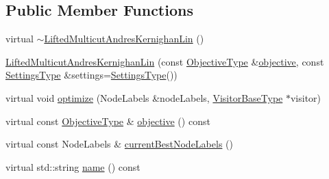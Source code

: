 \subsection*{Public Member Functions}
\begin{DoxyCompactItemize}
\item 
virtual \hyperlink{classnifty_1_1graph_1_1optimization_1_1lifted__multicut_1_1LiftedMulticutAndresKernighanLin_accb9a1a5271cc64b7e8c9e1fc1c264b6}{$\sim$\+Lifted\+Multicut\+Andres\+Kernighan\+Lin} ()
\item 
\hyperlink{classnifty_1_1graph_1_1optimization_1_1lifted__multicut_1_1LiftedMulticutAndresKernighanLin_ab5827128027f87c997e6f4ce5fecbb75}{Lifted\+Multicut\+Andres\+Kernighan\+Lin} (const \hyperlink{classnifty_1_1graph_1_1optimization_1_1lifted__multicut_1_1LiftedMulticutAndresKernighanLin_a658bf9081f6bab3e55d4707d1ca57780}{Objective\+Type} \&\hyperlink{classnifty_1_1graph_1_1optimization_1_1lifted__multicut_1_1LiftedMulticutAndresKernighanLin_a67c929ae76bdea96436c81d144aa648c}{objective}, const \hyperlink{structnifty_1_1graph_1_1optimization_1_1lifted__multicut_1_1LiftedMulticutAndresKernighanLin_1_1SettingsType}{Settings\+Type} \&settings=\hyperlink{structnifty_1_1graph_1_1optimization_1_1lifted__multicut_1_1LiftedMulticutAndresKernighanLin_1_1SettingsType}{Settings\+Type}())
\item 
virtual void \hyperlink{classnifty_1_1graph_1_1optimization_1_1lifted__multicut_1_1LiftedMulticutAndresKernighanLin_a587b8e8dcdba7aa6404f87eea1db687a}{optimize} (Node\+Labels \&node\+Labels, \hyperlink{classnifty_1_1graph_1_1optimization_1_1lifted__multicut_1_1LiftedMulticutAndresKernighanLin_a36384cde373a8f776b897b4cb83607bb}{Visitor\+Base\+Type} $\ast$visitor)
\item 
virtual const \hyperlink{classnifty_1_1graph_1_1optimization_1_1lifted__multicut_1_1LiftedMulticutAndresKernighanLin_a658bf9081f6bab3e55d4707d1ca57780}{Objective\+Type} \& \hyperlink{classnifty_1_1graph_1_1optimization_1_1lifted__multicut_1_1LiftedMulticutAndresKernighanLin_a67c929ae76bdea96436c81d144aa648c}{objective} () const 
\item 
virtual const Node\+Labels \& \hyperlink{classnifty_1_1graph_1_1optimization_1_1lifted__multicut_1_1LiftedMulticutAndresKernighanLin_a50b1511d60305f0e3cbb9dcc46a1e74e}{current\+Best\+Node\+Labels} ()
\item 
virtual std\+::string \hyperlink{classnifty_1_1graph_1_1optimization_1_1lifted__multicut_1_1LiftedMulticutAndresKernighanLin_a5b289b2eebd717084c52d02ab5adc3bf}{name} () const 
\end{DoxyCompactItemize}


